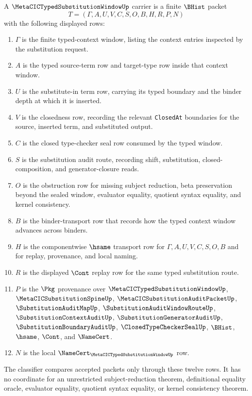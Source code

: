\begin{definition}
\label{def:metacic-typed-substitution-window-carrier}
A $\MetaCICTypedSubstitutionWindowUp$ carrier is a finite $\BHist$ packet
$$
T=(\Gamma,A,U,V,C,S,O,B,H,R,P,N)
$$
with the following displayed rows:
\begin{enumerate}
\item $\Gamma$ is the finite typed-context window, listing the context entries inspected by the substitution request.
\item $A$ is the typed source-term row and target-type row inside that context window.
\item $U$ is the substitute-in term row, carrying its typed boundary and the binder depth at which it is inserted.
\item $V$ is the closedness row, recording the relevant \texttt{ClosedAt} boundaries for the source, inserted term, and substituted output.
\item $C$ is the closed type-checker seal row consumed by the typed window.
\item $S$ is the substitution audit route, recording shift, substitution, closed-composition, and generator-closure reads.
\item $O$ is the obstruction row for missing subject reduction, beta preservation beyond the sealed window, evaluator equality, quotient syntax equality, and kernel consistency.
\item $B$ is the binder-transport row that records how the typed context window advances across binders.
\item $H$ is the componentwise $\hsame$ transport row for $\Gamma,A,U,V,C,S,O,B$ and for replay, provenance, and local naming.
\item $R$ is the displayed $\Cont$ replay row for the same typed substitution route.
\item $P$ is the $\Pkg$ provenance over $\MetaCICTypedSubstitutionWindowUp$, $\MetaCICSubstitutionSpineUp$, $\MetaCICSubstitutionAuditPacketUp$, $\SubstitutionAuditMapUp$, $\SubstitutionAuditWindowRouteUp$, $\SubstitutionContextAuditUp$, $\SubstitutionGeneratorAuditUp$, $\SubstitutionBoundaryAuditUp$, $\ClosedTypeCheckerSealUp$, $\BHist$, $\hsame$, $\Cont$, and $\NameCert$.
\item $N$ is the local $\NameCert_{\MetaCICTypedSubstitutionWindowUp}$ row.
\end{enumerate}
The classifier compares accepted packets only through these twelve rows. It has no coordinate for an unrestricted subject-reduction theorem, definitional equality oracle, evaluator equality, quotient syntax equality, or kernel consistency theorem.
\end{definition}

